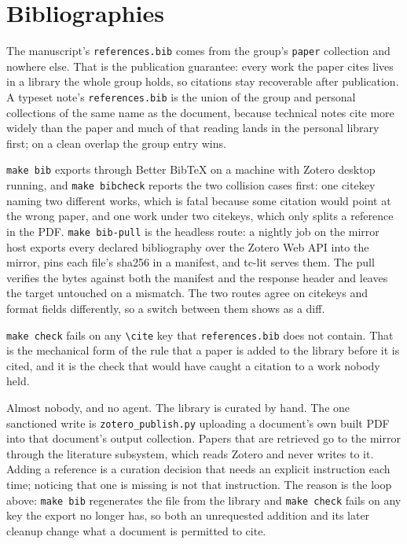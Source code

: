 
\section{Bibliographies}
\label{sec:bib}

The manuscript's \texttt{references.bib} comes from the group's \texttt{paper}
collection and nowhere else. That is the publication guarantee: every work the
paper cites lives in a library the whole group holds, so citations stay
recoverable after publication. A typeset note's \texttt{references.bib} is the
union of the group and personal collections of the same name as the document,
because technical notes cite more widely than the paper and much of that reading
lands in the personal library first; on a clean overlap the group entry wins.

\texttt{make bib} exports through Better BibTeX on a machine with Zotero desktop
running, and \texttt{make bibcheck} reports the two collision cases first: one
citekey naming two different works, which is fatal because some citation would
point at the wrong paper, and one work under two citekeys, which only splits a
reference in the PDF. \texttt{make bib-pull} is the headless route: a nightly job
on the mirror host exports every declared bibliography over the Zotero Web API into
the mirror, pins each file's sha256 in a manifest, and tc-lit serves them. The pull
verifies the bytes against both the manifest and the response header and leaves
the target untouched on a mismatch. The two routes agree on citekeys and format
fields differently, so a switch between them shows as a diff.

\texttt{make check} fails on any \texttt{\textbackslash cite} key that
\texttt{references.bib} does not contain. That is the mechanical form of the rule
that a paper is added to the library before it is cited, and it is the check that
would have caught a citation to a work nobody held.

Almost nobody, and no agent. The library is curated by hand. The one sanctioned
write is \texttt{zotero\_publish.py} uploading a document's own built PDF into that
document's output collection. Papers that are retrieved go to the mirror through
the literature subsystem, which reads Zotero and never writes to it. Adding a
reference is a curation decision that needs an explicit instruction each time;
noticing that one is missing is not that instruction. The reason is the loop
above: \texttt{make bib} regenerates the file from the library and \texttt{make
check} fails on any key the export no longer has, so both an unrequested addition
and its later cleanup change what a document is permitted to cite.
